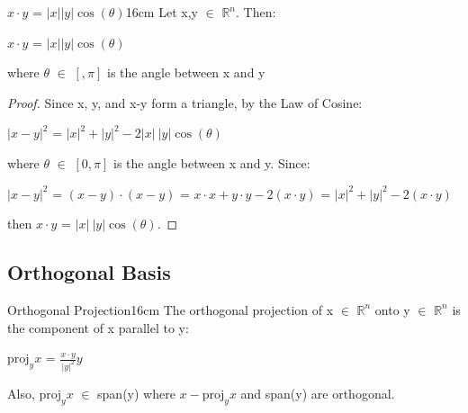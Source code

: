     \vspace{0.5cm}



    \begin{wtheorem}{$x \cdot y$ = $|x| |y| \cos(\theta)$}{16cm}
        Let x,y $\in$ $\mathbb{R}^n$. Then:

        \hspace{0.5cm}
        $x \cdot y$ = $|x| |y| \cos(\theta)$

        where $\theta$ $\in$ $[,\pi]$ is the angle between x and y
    \end{wtheorem}

    \begin{proof}
        Since x, y, and x-y form a triangle, by the Law of Cosine:

        \hspace{0.5cm}
        $|x-y|^2$ = $|x|^2 + |y|^2 - 2|x| \ |y| \cos(\theta)$
        
        where $\theta$ $\in$ $[0,\pi]$ is the angle between x and y. Since:

        \hspace{0.5cm}
        $|x-y|^2$
        = $(x - y) \cdot (x - y)$
        = $x \cdot x + y \cdot y - 2(x \cdot y)$
        = $|x|^2 + |y|^2 - 2(x \cdot y)$

        then $x \cdot y$ = $|x| \ |y| \cos(\theta)$.
    \end{proof}

    \newpage





\subsection{ Orthogonal Basis }

    \begin{wtheorem}{Orthogonal Projection}{16cm}
        The {\color{lblue} orthogonal projection} of x $\in$ $\mathbb{R}^n$ onto
        y $\in$ $\mathbb{R}^n$ is the component of x parallel to y:

        \hspace{0.5cm}
        $\text{proj}_yx$ = $\frac{x \cdot y}{|y|^2}y$

        Also, $\text{proj}_yx$ $\in$ span(y)
        where $x - \text{proj}_yx$ and span(y) are orthogonal.
    \end{wtheorem}

